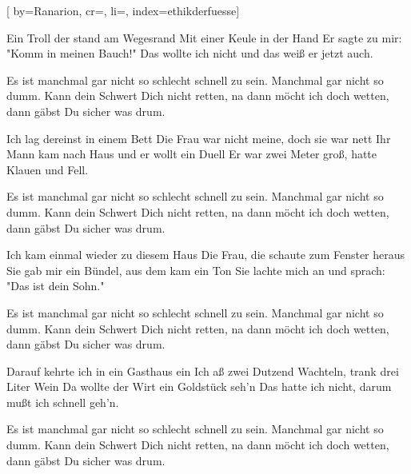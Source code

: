
[%
    by={Ranarion},
    cr={},
    li={},
    index={ethikderfuesse}]


    \label{ethikderfuesse}

    \beginverse\memorize[verse]
        Ein Troll der stand am Wegesrand
        Mit einer Keule in der Hand
        Er sagte zu mir: "Komm in meinen Bauch!"
        Das wollte ich nicht und das weiß er jetzt auch.
    \endverse

    \beginchorus\memorize[chorus]
        Es ist manchmal gar nicht so schlecht schnell zu sein.
        Manchmal gar nicht so dumm.
        Kann dein Schwert Dich nicht retten,
        na dann möcht ich doch wetten, dann gäbst Du sicher was drum.
    \endchorus

    \beginverse\replay[verse]
        Ich lag dereinst in einem Bett
        Die Frau war nicht meine, doch sie war nett
        Ihr Mann kam nach Haus und er wollt ein Duell
        Er war zwei Meter groß, hatte Klauen und Fell.
    \endverse

    \beginchorus\replay[chorus]
        Es ist manchmal gar nicht so schlecht schnell zu sein.
        Manchmal gar nicht so dumm.
        Kann dein Schwert Dich nicht retten,
        na dann möcht ich doch wetten, dann gäbst Du sicher was drum.
    \endchorus

    \beginverse\replay[verse]
        Ich kam einmal wieder zu diesem Haus
        Die Frau, die schaute zum Fenster heraus
        Sie gab mir ein Bündel, aus dem kam ein Ton
        Sie lachte mich an und sprach: "Das ist dein Sohn."
    \endverse

    \beginchorus\replay[chorus]
        Es ist manchmal gar nicht so schlecht schnell zu sein.
        Manchmal gar nicht so dumm.
        Kann dein Schwert Dich nicht retten,
        na dann möcht ich doch wetten, dann gäbst Du sicher was drum.
    \endchorus

    \beginverse\replay[verse]
        Darauf kehrte ich in ein Gasthaus ein
        Ich aß zwei Dutzend Wachteln, trank drei Liter Wein
        Da wollte der Wirt ein Goldstück seh'n
        Das hatte ich nicht, darum mußt ich schnell geh'n.
    \endverse

    \beginchorus\replay[chorus]
        Es ist manchmal gar nicht so schlecht schnell zu sein.
        Manchmal gar nicht so dumm.
        Kann dein Schwert Dich nicht retten,
        na dann möcht ich doch wetten, dann gäbst Du sicher was drum.
    \endchorus

